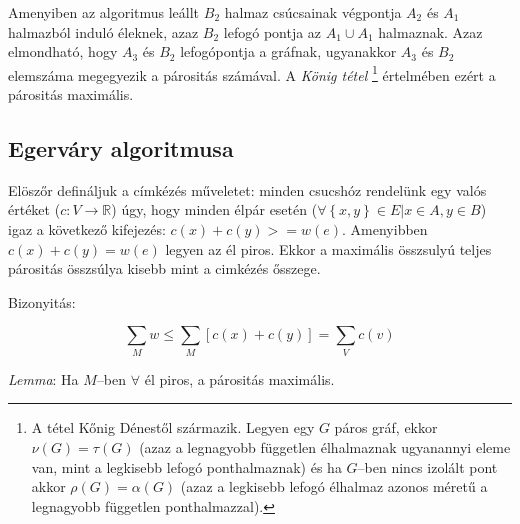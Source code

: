 Amenyiben az algoritmus leállt $B_2$ halmaz csúcsainak végpontja $A_2$ és $A_1$
halmazból induló éleknek, azaz $B_2$ lefogó pontja az $A_1 \cup A_1$ halmaznak.
Azaz elmondható, hogy $A_3$ és $B_2$ lefogópontja a gráfnak, ugyanakkor $A_3$ és
$B_2$ elemszáma megegyezik a párositás számával. A \emph{König tétel} \footnote{
A tétel Kőnig Dénestől származik. Legyen egy $G$ páros gráf, ekkor
$\nu(G)=\tau(G)$ (azaz a legnagyobb független élhalmaznak ugyanannyi eleme van,
mint a legkisebb lefogó ponthalmaznak) és ha $G$--ben nincs izolált pont akkor
$\rho(G)=\alpha(G)$ (azaz a legkisebb lefogó élhalmaz azonos méretű a legnagyobb
független ponthalmazzal).} értelmében ezért a párositás maximális.

\subsection{Egerváry algoritmusa}

Elöszőr defináljuk a címkézés műveletet: minden csucshóz rendelünk egy valós
értéket ($c:V \rightarrow \mathbb{R}$) úgy, hogy minden élpár esetén ($\forall
\left\{x,y\right\} \in E | x \in A, y \in B$)  igaz a következő kifejezés:
$c(x)+c(y)>=w(e).$ Amenyibben $c(x)+c(y)=w(e)$ legyen az él piros. Ekkor a
maximális összsulyú teljes párositás összsúlya kisebb mint a cimkézés ősszege.

Bizonyitás:

\begin{displaymath}
\sum_M{w} \leq \sum_M{\left[c(x)+c(y)\right]} = \sum_V{c(v)}
\end{displaymath}

\emph{Lemma}: Ha $M$--ben $\forall$ él piros, a párositás maximális.

